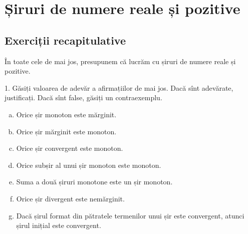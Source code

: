 \chapter{Șiruri de numere reale și pozitive}

\section{Exerciții recapitulative}

În toate cele de mai jos, presupunem că lucrăm cu șiruri de numere reale și pozitive.

\vspace{1cm}

1. Găsiți valoarea de adevăr a afirmațiilor de mai jos. Dacă sînt adevărate,
justificați. Dacă sînt false, găsiți un contraexemplu.
\begin{enumerate}[(a)]
    \item Orice șir monoton este mărginit.
    \item Orice șir mărginit este monoton.
    \item Orice șir convergent este monoton.
    \item Orice subșir al unui șir monoton este monoton.
    \item Suma a două șiruri monotone este un șir monoton.
    \item Orice șir divergent este nemărginit.
    \item Dacă șirul format din pătratele termenilor unui șir este convergent,
        atunci șirul inițial este convergent.
\end{enumerate}

\vspace{1cm}

